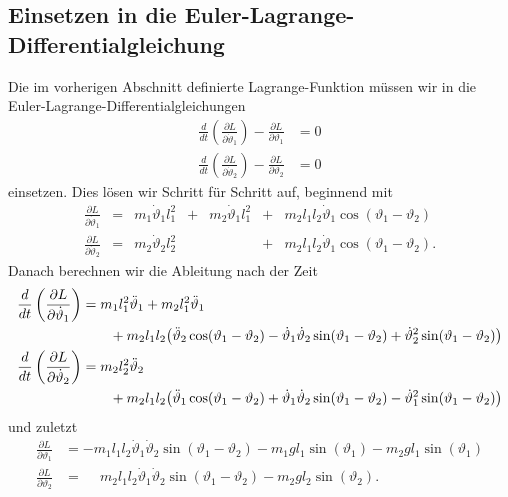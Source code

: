 \subsection{Einsetzen in die Euler-Lagrange-Differentialgleichung}
Die im vorherigen Abschnitt definierte Lagrange-Funktion müssen wir in
die Euler-Lagrange-Differentialgleichungen
\begin{align}
    \label{eq:lag1}
    \frac{d}{dt} \left(\frac{\partial L}{\partial \dot{\vartheta}_1}\right) 
    - \frac{\partial L}{\partial \vartheta_1} &= 0\\
    \label{eq:lag2}
    \frac{d}{dt} \left(\frac{\partial L}{\partial \dot{\vartheta}_2}\right) 
    - \frac{\partial L}{\partial \vartheta_2} &= 0
\end{align}
einsetzen.
Dies lösen wir Schritt für Schritt auf, beginnend mit
\begin{equation*}
\renewcommand{\arraycolsep}{1.5pt}
\begin{array}{rclclcl}
\displaystyle
\frac{\partial L}{\partial \dot{\vartheta}_1}
&=& m_1 \dot{\vartheta}_1 l_1^2
&+& m_2 \dot{\vartheta}_1 l_1^2
&+& m_2 l_1 l_2 \dot{\vartheta}_1 \cos(\vartheta_1-\vartheta_2)
\\[9pt]
\displaystyle
\frac{\partial L}{\partial \dot{\vartheta}_2}
&=& m_2 \dot{\vartheta}_2 l_2^2
& &
&+& m_2 l_1 l_2 \dot{\vartheta}_1 \cos(\vartheta_1-\vartheta_2).
\end{array}
\end{equation*}
Danach berechnen wir die Ableitung nach der Zeit
\begin{align*}
    \frac{d}{dt} \left(\frac{\partial L}{\partial \dot{\vartheta}_1}\right)
&=
    m_1 l_1^2 \ddot{\vartheta}_1 + m_2 l_1^2 \ddot{\vartheta}_1
\\
&\qquad
+ m_2 l_1 l_2 \bigl(\ddot{\vartheta}_2\cos(\vartheta_1-\vartheta_2)-
    \dot{\vartheta}_1 \dot{\vartheta}_2 \sin(\vartheta_1-\vartheta_2)
+ \dot{\vartheta}_2^2 \sin(\vartheta_1-\vartheta_2)\bigr)\\
    \frac{d}{dt} \left(\frac{\partial L}{\partial \dot{\vartheta}_2}\right)
&=
    m_2 l_2^2 \ddot{\vartheta}_2
    \phantom{\mathstrut+ m_2 l_1^2 \ddot{\vartheta}_1}
\\
&\qquad
+ m_2 l_1 l_2 \bigl(\ddot{\vartheta}_1\cos(\vartheta_1-\vartheta_2)+
    \dot{\vartheta}_1 \dot{\vartheta}_2 \sin(\vartheta_1-\vartheta_2)
 - \dot{\vartheta}_1^2 \sin(\vartheta_1-\vartheta_2)\bigr)
\end{align*}
und zuletzt
\begin{align*}
    \frac{\partial L}{\partial {\vartheta}_1} &= -m_1 l_1 l_2 \dot{\vartheta}_1
    \dot{\vartheta}_2 \sin(\vartheta_1-\vartheta_2) - m_1 g l_1 \sin(\vartheta_1)
    - m_2 g l_1 \sin(\vartheta_1)\\
    \frac{\partial L}{\partial {\vartheta}_2} &= \phantom{-}m_2 l_1 l_2 \dot{\vartheta}_1
    \dot{\vartheta}_2 \sin(\vartheta_1-\vartheta_2) - m_2 g l_2 \sin(\vartheta_2).
\end{align*}
